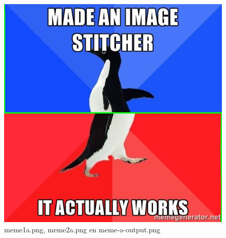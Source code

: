 \documentclass{article}
\begin{document}
\begin{figure}[h!]
\includegraphics[scale=0.2]{../myexamples/meme-a-output.png}
\caption{meme1a.png, meme2a.png en meme-a-output.png}
\label{fig:MemeA}
\end{figure}
\end{document}
